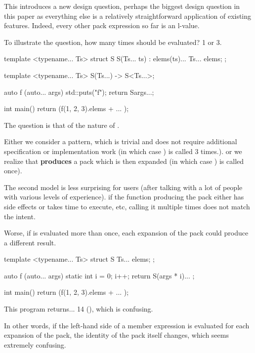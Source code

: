 \documentclass{wg21}
\begin{document}
This introduces a new design question, perhaps the biggest design question in this paper
as everything else is a relatively straightforward application of existing features.
Indeed, every other pack expression so far is an l-value.

To illustrate the question, how many times should  be evaluated? 1 or 3.

\begin{colorblock}
template <typename... Ts>
struct S {
    S(Ts... ts) : elems(ts)... {}
    Ts... elems;
};

template <typename... Ts>
S(Ts...) -> S<Ts...>;

auto f (auto... args) {
    std::puts("f");
    return S{args...};
}

int main() {
    return (f(1, 2, 3).elems + ... );
}
\end{colorblock}

The question is that of the nature of .

Either we consider  a pattern, which is trivial
and does not require additional specification or implementation work (in which case ) is called 3 times.).
or we realize that 
\textbf{produces} a pack which is then expanded (in which case ) is called once).

The second model is less surprising for users (after talking with a lot of people with various levels of experience).
if the function producing the pack either has side effects or takes time to execute, etc, calling it multiple times
does not match the intent.

Worse, if  is evaluated more than once, each expansion of the pack could produce a different result.

\begin{colorblock}
template <typename... Ts>
struct S { Ts... elems; };

auto f (auto... args) {
    static int i = 0;
    i++;
    return S{(args * i)... };
}

int main() {
    return (f(1, 2, 3).elems + ... );
}
\end{colorblock}

This program returns... 14 (), which is confusing.

In other words, if the left-hand side of a member expression is evaluated for each
expansion of the pack, the identity of the pack itself changes, which seems extremely confusing.
\end{document}
